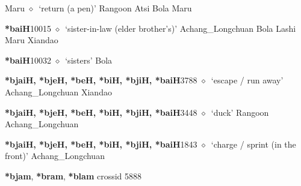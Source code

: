 \begin{list}{}{\leftmargin=1.5em \itemindent=-1.5em}
         Maru 
\hspace{1ex}
         $\diamond$~`return (a pen)'
         Rangoon 
\hspace{1ex}
         Atsi 
\hspace{1ex}
         Bola 
\hspace{1ex}
         Maru 
  \item {\footnotesize \textbf{*baiH}}{\tiny 10015}
\hspace{1ex}
         $\diamond$~`sister-in-law (elder brother's)'
         Achang\_Longchuan 
\hspace{1ex}
         Bola 
\hspace{1ex}
         Lashi 
\hspace{1ex}
         Maru 
\hspace{1ex}
         Xiandao 
  \item {\footnotesize \textbf{*baiH}}{\tiny 10032}
\hspace{1ex}
         $\diamond$~`sisters'
         Bola 
  \item {\footnotesize \textbf{*bjaiH, *bjeH, *beH, *biH, *bjiH, *baiH}}{\tiny 3788}
\hspace{1ex}
         $\diamond$~`escape / run away'
         Achang\_Longchuan 
\hspace{1ex}
         Xiandao 
  \item {\footnotesize \textbf{*bjaiH, *bjeH, *beH, *biH, *bjiH, *baiH}}{\tiny 3448}
\hspace{1ex}
         $\diamond$~`duck'
         Rangoon 
\hspace{1ex}
         Achang\_Longchuan 
  \item {\footnotesize \textbf{*bjaiH, *bjeH, *beH, *biH, *bjiH, *baiH}}{\tiny 1843}
\hspace{1ex}
         $\diamond$~`charge / sprint (in the front)'
         Achang\_Longchuan 
  \end{list}
\item
\textbf{*bjam}, \textbf{*bram}, \textbf{*blam}
  {\tiny crossid 5888}
